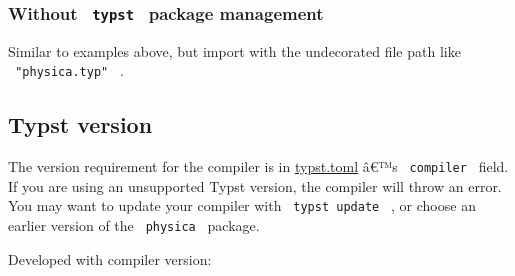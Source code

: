 \begin{Shaded}
\begin{Highlighting}[]

\end{Highlighting}
\end{Shaded}

\begin{Shaded}
\begin{Highlighting}[]

\end{Highlighting}
\end{Shaded}

\subsubsection{\texorpdfstring{Without \texttt{\ typst\ } package
management}{Without  typst  package management}}\label{without-typst-package-management}

Similar to examples above, but import with the undecorated file path
like \texttt{\ "physica.typ"\ } .

\subsection{Typst version}\label{typst-version}

The version requirement for the compiler is in
\href{https://github.com/typst/packages/raw/main/packages/preview/physica/0.9.3/typst.toml}{typst.toml}
â€™s \texttt{\ compiler\ } field. If you are using an unsupported Typst
version, the compiler will throw an error. You may want to update your
compiler with \texttt{\ typst\ update\ } , or choose an earlier version
of the \texttt{\ physica\ } package.

Developed with compiler version:

\begin{Shaded}
\begin{Highlighting}[]
\ExtensionTok{$}
\ErrorTok{(}\KeywordTok{)}
\end{Highlighting}
\end{Shaded}

